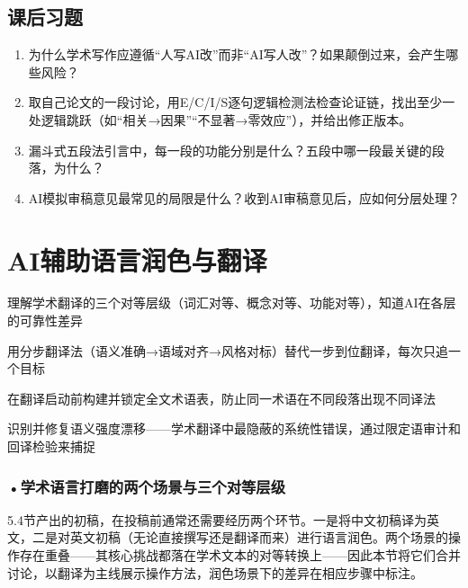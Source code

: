 \subsection*{课后习题}
\begin{enumerate}
\setlength{\itemsep}{6pt}

\item 为什么学术写作应遵循``人写AI改''而非``AI写人改''？如果颠倒过来，会产生哪些风险？

\item 取自己论文的一段讨论，用E/C/I/S逐句逻辑检测法检查论证链，找出至少一处逻辑跳跃（如``相关→因果''``不显著→零效应''），并给出修正版本。

\item 漏斗式五段法引言中，每一段的功能分别是什么？五段中哪一段最关键的段落，为什么？

\item AI模拟审稿意见最常见的局限是什么？收到AI审稿意见后，应如何分层处理？

\end{enumerate}
\newpage

\section{AI辅助语言润色与翻译}
\label{sec:5.5}

\begin{sectionkeypoints}
\item 理解学术翻译的三个对等层级（词汇对等、概念对等、功能对等），知道AI在各层的可靠性差异
\item 用分步翻译法（语义准确→语域对齐→风格对标）替代一步到位翻译，每次只追一个目标
\item 在翻译启动前构建并锁定全文术语表，防止同一术语在不同段落出现不同译法
\item 识别并修复语义强度漂移——学术翻译中最隐蔽的系统性错误，通过限定语审计和回译检验来捕捉
\end{sectionkeypoints}

\subsubsection*{\textbf{•学术语言打磨的两个场景与三个对等层级}}

5.4节产出的初稿，在投稿前通常还需要经历两个环节。一是将中文初稿译为英文，二是对英文初稿（无论直接撰写还是翻译而来）进行语言润色。两个场景的操作存在重叠——其核心挑战都落在学术文本的对等转换上——因此本节将它们合并讨论，以翻译为主线展示操作方法，润色场景下的差异在相应步骤中标注。

